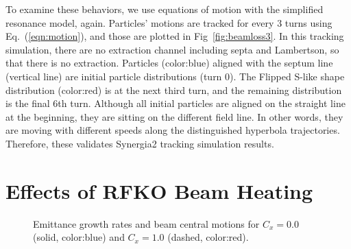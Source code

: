 \documentclass[aps,prstab,onecolumn,preprint]{revtex4-1}
\begin{document}
To examine these behaviors, we use equations of motion with the simplified resonance model, again. Particles' motions are tracked for every 3 turns using Eq.~(\ref{eqn:motion}), and those are plotted in Fig~\ref{fig:beamloss3}. In this tracking simulation, there are no extraction channel including septa and Lambertson, so that there is no extraction. Particles (color:blue) aligned with the septum line (vertical line) are initial particle distributions (turn 0). The Flipped S-like shape distribution (color:red) is at the next third turn, and the remaining distribution is the final 6th turn. Although all initial particles are aligned on the straight line at the beginning, they are sitting on the different field line. In other words, they are moving with different speeds along the distinguished hyperbola trajectories. Therefore, these validates Synergia2 tracking simulation results. 


\section{\label{sec:rfko}Effects of RFKO Beam Heating}

\begin{figure}[!tbp]
  \caption{\label{fig:rfko1}Emittance growth rates and beam central motions for $C_{x} = 0.0$ (solid, color:blue) and $C_{x} = 1.0$ (dashed, color:red).}
\end{figure}
\end{document}
